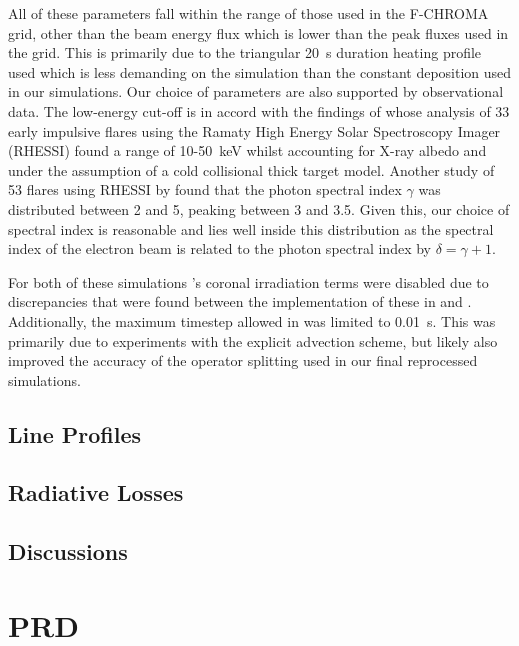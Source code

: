 All of these parameters fall within the range of those used in the F-CHROMA grid, other than the beam energy flux which is lower than the peak fluxes used in the grid.
This is primarily due to the triangular \SI{20}{\second} duration heating profile used which is less demanding on the simulation than the constant deposition used in our simulations.
Our choice of parameters are also supported by observational data.
The low-energy cut-off is in accord with the findings of \citet{Sui2007} whose analysis of 33 early impulsive flares using the Ramaty High Energy Solar Spectroscopy Imager (RHESSI) found a range of 10-\SI{50}{\kilo\electronvolt} whilst accounting for X-ray albedo and under the assumption of a cold collisional thick target model.
Another study of 53 flares using RHESSI by \citet{Saint-Hilaire2008} found that the photon spectral index $\gamma$ was distributed between 2 and 5, peaking between 3 and 3.5.
Given this, our choice of spectral index is reasonable and lies well inside this distribution as the spectral index of the electron beam is related to the photon spectral index by $\delta = \gamma + 1$.

For both of these simulations \Radyn{}'s coronal irradiation terms were disabled due to discrepancies that were found between the implementation of these in \Radyn{} and \Lw{}.
Additionally, the maximum timestep allowed in \Radyn{} was limited to \SI{0.01}{\second}.
This was primarily due to experiments with the explicit advection scheme, but likely also improved the accuracy of the operator splitting used in our final reprocessed simulations.

\subsection{Line Profiles}

\subsection{Radiative Losses}

\subsection{Discussions}

\section{PRD}